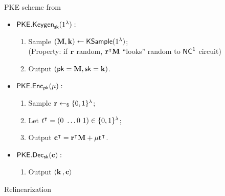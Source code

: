 \begin{frame}{PKE scheme from \cite{fgcrypto}}
	\begin{itemize}
		\item $\mathsf{PKE.Keygen}_{\mathsf{sk}}(1^{\lambda}):$
		\begin{enumerate}
			\item Sample $(\mathbf{M}, \mathbf{k}) \gets \mathsf{KSample}(1^{\lambda})$;\\
			 {\color{red}(Property: if $\mathbf{r}$ random, ${\mathbf{r}}^{\intercal}  \mathbf{M}$ ``looks'' random to ${\mathsf{NC}}^1$ circuit)}
			\item Output $(\mathsf{pk} = \mathbf{M}, \mathsf{sk} = \mathbf{k})$.
		\end{enumerate}
		\item $\mathsf{PKE.Enc}_{\mathsf{pk}}(\mu):$
		\begin{enumerate}
			\item Sample $\mathbf{r} \leftarrow_{\$} \{0, 1\}^{\lambda}$;
			\item Let ${t}^{\intercal} = (0 \ \dots 0 \ 1) \in \{0, 1\}^{\lambda}$;
			\item Output ${\mathbf{c}}^{\intercal} = {\mathbf{r}}^{\intercal}  \mathbf{M} + \mu{\mathbf{t}}^{\intercal}$.
		\end{enumerate}
		\item $\mathsf{PKE.Dec}_{\mathsf{sk}}(\mathbf{c}):$
		\begin{enumerate}
			\item Output $\langle \mathbf{k} \, , \mathbf{c} \rangle$
		\end{enumerate}
		
	\end{itemize}
\end{frame}

\begin{frame}{Relinearization \cite{fhe-lwe}}
\end{frame}